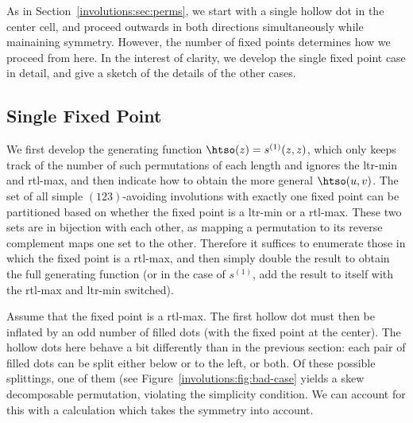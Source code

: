 \documentclass[12pt,twoside]{memoir}
\begin{document}
      As in Section~\ref{involutions:sec:perms}, we start with a single hollow
      dot in the center cell, and proceed outwards in both directions
      simultaneously while mainaining symmetry. However, the number of fixed
      points determines how we proceed from here. In the interest of clarity, we
      develop the single fixed point case in detail, and give a sketch of the
      details of the other cases. 

    \subsection{Single Fixed Point}
   

      We first develop the generating function $\htso(z) = s^{(1)}(z,z)$, which
      only keeps track of the number of such permutations of each length and
      ignores the ltr-min and rtl-max, and then indicate how to obtain the
      more general $\htso(u,v)$. The set of all simple $(123)$-avoiding
      involutions with exactly one fixed point can be partitioned based on
      whether the fixed point is a ltr-min or a rtl-max. These two sets are
      in bijection with each other, as mapping a permutation to its reverse
      complement maps one set to the other. Therefore it suffices to enumerate
      those in which the fixed point is a rtl-max, and then simply double the
      result to obtain the full generating function (or in the case of $s^{(1)}$,
      add the result to itself with the rtl-max and ltr-min switched). 
    
      Assume that the fixed point is a rtl-max. The first hollow dot must then
      be inflated by an odd number of filled dots (with the fixed point at the
      center). The hollow dots here behave a bit differently than in the previous
      section: each pair of filled dots can be split either below or to the left,
      or both. Of these possible splittings, one of them (see
      Figure~\ref{involutions:fig:bad-case} yields a skew decomposable
      permutation, violating the simplicity condition. We can account for this
      with a calculation which takes the symmetry into account. 
\end{document}
